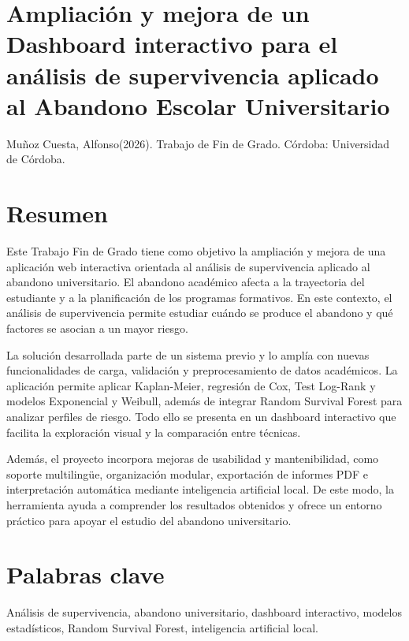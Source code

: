 
\section*{Ampliación y mejora de un Dashboard interactivo para el análisis de supervivencia aplicado al Abandono Escolar Universitario}

\noindent
Muñoz Cuesta, Alfonso(2026). Trabajo de Fin de Grado. Córdoba: Universidad de Córdoba.
\section*{Resumen}
Este Trabajo Fin de Grado tiene como objetivo la ampliación y mejora de una aplicación web interactiva orientada al análisis de supervivencia aplicado al abandono universitario. El abandono académico afecta a la trayectoria del estudiante y a la planificación de los programas formativos. En este contexto, el análisis de supervivencia permite estudiar cuándo se produce el abandono y qué factores se asocian a un mayor riesgo.

La solución desarrollada parte de un sistema previo y lo amplía con nuevas funcionalidades de carga, validación y preprocesamiento de datos académicos. La aplicación permite aplicar Kaplan-Meier, regresión de Cox, Test Log-Rank y modelos Exponencial y Weibull, además de integrar Random Survival Forest para analizar perfiles de riesgo. Todo ello se presenta en un dashboard interactivo que facilita la exploración visual y la comparación entre técnicas.

Además, el proyecto incorpora mejoras de usabilidad y mantenibilidad, como soporte multilingüe, organización modular, exportación de informes PDF e interpretación automática mediante inteligencia artificial local. De este modo, la herramienta ayuda a comprender los resultados obtenidos y ofrece un entorno práctico para apoyar el estudio del abandono universitario.
\section*{Palabras clave}
Análisis de supervivencia, abandono universitario, dashboard interactivo, modelos estadísticos, Random Survival Forest, inteligencia artificial local.
\newpage
